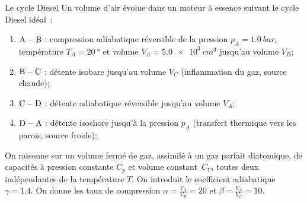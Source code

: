 \begin{exo}[PT][1]{Le cycle Diesel}
Un volume d'air évolue dans un moteur à essence suivant le cycle Diesel idéal~:
\begin{enumerate}
	\item $\rm A - B$ : compression adiabatique réversible de la pression $p_A=\SI{1.0}{bar}$, température $T_A=\SI{20}{\degree}$ et volume $V_A=\SI{5.0e3}{cm^3}$ jusqu'au volume $V_B$;
	\item $\rm B - C$ : détente isobare jusqu'au volume $V_C$ (inflammation du gaz, source chaude);
	\item $\rm C - D$ : détente adiabatique réversible  jusqu'au volume $V_A$;
	\item $\rm D - A$ : détente isochore jusqu’à la pression $p_A$ (transfert thermique vers les parois, source froide);
\end{enumerate}

 On raisonne sur un volume fermé de gaz, assimilé à un gaz parfait diatomique, de capacités à pression constante $C_p$ et volume constant~$C_V$, toutes deux indépendantes de la température $T$. On introduit le coefficient adiabatique $\gamma=\num{1.4}$. On donne les taux de compression $\alpha = \textstyle\frac{V_A}{V_B}=20$ et $\beta = \textstyle\frac{V_A}{V_C}=10$.

\begin{quest}


\end{quest}
\end{exo}

